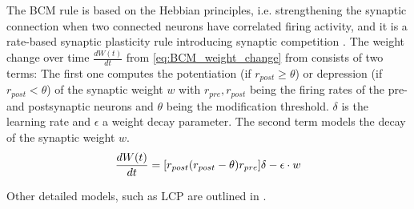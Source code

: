 The \ac{BCM} rule is based on the Hebbian principles, i.e. strengthening the synaptic connection when two connected neurons have correlated firing activity, 
and it is a rate-based synaptic plasticity rule introducing synaptic competition \cite{simulation_STDP}.
The weight change over time $\frac{dW(t)}{dt}$ from \autoref{eq:BCM_weight_change} from \cite{simulation_STDP} consists of two terms:
The first one computes the potentiation (if $r_{post} \ge \theta$) or depression (if $r_{post} < \theta$) of the synaptic weight $w$ with 
$r_{pre}, r_{post}$ being the firing rates of the pre- and postsynaptic neurons and $\theta$ being the modification threshold.
$\delta$ is the learning rate and $\epsilon$ a weight decay parameter.
The second term models the decay of the synaptic weight $w$.
%
\begin{equation}
    \centering
    \label{eq:BCM_weight_change}
    \frac{dW(t)}{dt} = [r_{post}(r_{post} - \theta)r_{pre}]\delta - \epsilon \cdot w
\end{equation}

Other detailed models, such as \ac{LCP} are outlined in \cite{Synaptic_plasticity}.



